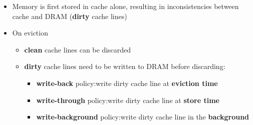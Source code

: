 \newpar{}
\begin{itemize}
    \item Memory is first stored in cache alone, resulting in inconsistencies between cache and DRAM (\textbf{dirty} cache lines)
    \item On eviction
          \begin{itemize}
              \item \textbf{clean} cache lines can be discarded
              \item \textbf{dirty} cache lines need to be written to DRAM before discarding:
                    \begin{itemize}
                        \item \textbf{write-back} policy:\newline write dirty cache line at \textbf{eviction time}
                        \item \textbf{write-through} policy:\newline write dirty cache line at \textbf{store time}
                        \item \textbf{write-background} policy:\newline write dirty cache line in the \textbf{background}
                    \end{itemize}
          \end{itemize}
\end{itemize}